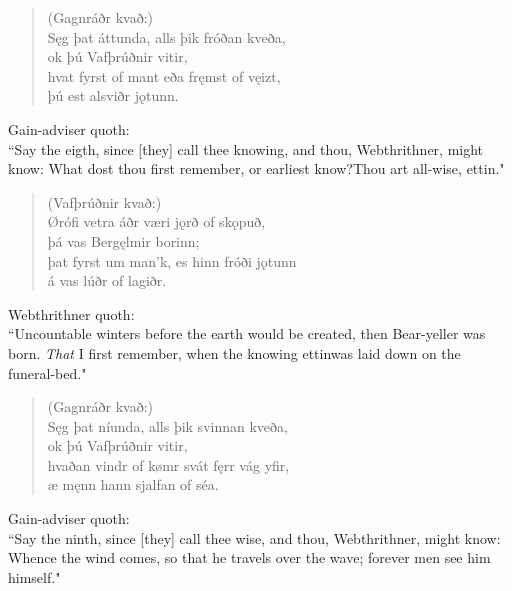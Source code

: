 \begin{verse}
(Gagnráðr kvað:) \\%
\bva Sęg þat áttunda, \hld alls þik fróðan kveða, \\%
\ind ok þú Vafþrúðnir vitir, \\%
hvat fyrst of mant \hld eða fręmst of vęizt, \\%
\ind þú est alsviðr jǫtunn.\\%
\end{verse}

\bvb Gain-adviser quoth: \\ “Say the eigth, since [they] call thee knowing, and thou, Webthrithner, might know: What dost thou first remember, or earliest know?\footnotemark[55] Thou art all-wise, ettin." \\

\begin{verse}
(Vafþrúðnir kvað:) \\%
\bva Ørófi vetra \hld áðr væri jǫrð of skǫpuð, \\%
\ind þá vas Bergęlmir borinn; \\%
þat fyrst um man'k, \hld es hinn fróði jǫtunn \\%
\ind á vas lúðr of lagiðr.\footnotemark[30]\\%
\end{verse}

\bvb Webthrithner quoth: \\ “Uncountable winters before the earth would be created, then Bear-yeller was born. \emph{That} I first remember, when the knowing ettin\footnotemark[60] was laid down on the funeral-bed\footnotemark[61]." \\

\begin{verse}
(Gagnráðr kvað:) \\%
\bva Sęg þat níunda, \hld alls þik svinnan kveða, \\%
\ind ok þú Vafþrúðnir vitir, \\%
hvaðan vindr of kømr \hld svát fęrr vág yfir, \\%
\ind æ męnn hann sjalfan of séa.\\%
\end{verse}

\bvb Gain-adviser quoth: \\ “Say the ninth, since [they] call thee wise, and thou, Webthrithner, might know: Whence the wind comes, so that he travels over the wave; forever men see him himself.\footnotemark[65]" \\

